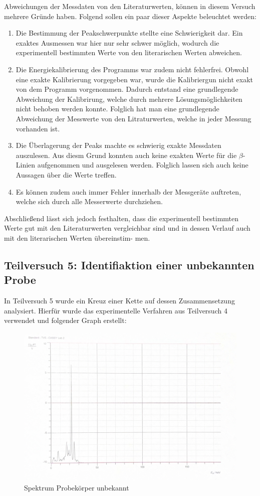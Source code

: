 \documentclass{article}
\begin{document}
\begin{enumerate}
Abweichungen der Messdaten von den Literaturwerten, können in diesem Versuch mehrere Gründe haben. Folgend sollen ein paar dieser Aspekte beleuchtet werden:

\begin{enumerate}
    \item Die Bestimmung der Peakschwerpunkte stellte eine Schwierigkeit dar. Ein exaktes Ausmessen war hier nur sehr schwer möglich, wodurch die experimentell bestimmten Werte von den literarischen Werten abweichen.
    \item Die Energiekalibrierung des Programms war zudem nicht fehlerfrei. Obwohl eine exakte Kalibrierung vorgegeben war, wurde die Kalibriergun nicht exakt von dem Programm vorgenommen. Dadurch entstand eine grundlegende Abweichung der Kalibrirung, welche durch mehrere Lösungsmöglichkeiten nicht behoben werden konnte. Folglich hat man  eine grundlegende Abweichung der Messwerte von den Litraturwerten, welche in jeder Messung vorhanden ist.
    \item Die Überlagerung der Peaks machte es schwierig exakte Messdaten auszulesen. Aus diesm Grund konnten auch keine exakten Werte für die $\beta$-Linien aufgenommen und ausgelesen werden. Folglich lassen sich auch keine Aussagen über die Werte treffen.
    \item Es können zudem auch immer Fehler innerhalb der Messgeräte auftreten, welche sich durch alle Messerwerte durchziehen.
\end{enumerate}

Abschließend lässt sich jedoch festhalten, dass die experimentell bestimmten Werte gut mit den Literaturwerten vergleichbar sind und in dessen Verlauf auch mit den literarischen Werten übereinstim- men.

\end{enumerate}

\newpage

\subsection{Teilversuch 5: Identifiaktion einer unbekannten Probe}

In Teilversuch 5 wurde ein Kreuz einer Kette auf dessen Zusammensetzung analysiert. Hierfür wurde das experimentelle Verfahren aus Teilversuch 4 verwendet und folgender Graph erstellt:

\begin{figure}[H]
    \centering
    \includegraphics[width=0.7\linewidth]{Abbildungen/TV5_Spektrum.png}
    \caption{Spektrum Probekörper unbekannt}
\end{figure}
\end{document}
